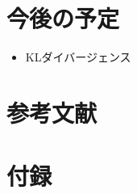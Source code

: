 \documentclass[report]{jlreq}
\begin{document}
%
\section*{今後の予定}

\begin{itemize}
    \item KLダイバージェンス
\end{itemize}

%
\section*{参考文献}

\nocite{amari_information_2016}

{
    \renewcommand{\bibsection}{}
    
    
}

%
\newpage
\appendix
\renewcommand\thesection{\Alph{section}}
\setcounter{section}{0}
\section{付録}
\end{document}
